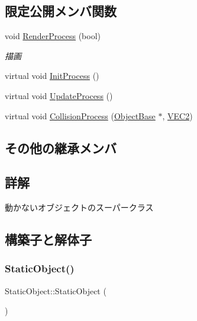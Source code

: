 \subsection*{限定公開メンバ関数}
\begin{DoxyCompactItemize}
\item 
void \mbox{\hyperlink{class_static_object_afec57009537695c4715386120a619942}{Render\+Process}} (bool)
\begin{DoxyCompactList}\small\item\em 描画 \end{DoxyCompactList}\item 
virtual void \mbox{\hyperlink{class_static_object_afa0709f50495338a23c1140062a567af}{Init\+Process}} ()
\item 
virtual void \mbox{\hyperlink{class_static_object_a7fa678c3c4032bb6e9417f93a8bb895c}{Update\+Process}} ()
\item 
virtual void \mbox{\hyperlink{class_static_object_ab17d0cb5b2544054022356a7ee4000db}{Collision\+Process}} (\mbox{\hyperlink{class_object_base}{Object\+Base}} $\ast$, \mbox{\hyperlink{transform_8h_afb0c5e21d4133ff4f200992c0b534e1b}{V\+E\+C2}})
\end{DoxyCompactItemize}
\subsection*{その他の継承メンバ}


\subsection{詳解}
動かないオブジェクトのスーパークラス 

\subsection{構築子と解体子}
\mbox{\label{class_static_object_a2a8e918ddfe5c6723b88b9f5c4156472}} 
\subsubsection{\texorpdfstring{Static\+Object()}{StaticObject()}}
{\footnotesize\ttfamily Static\+Object\+::\+Static\+Object (\begin{DoxyParamCaption}{ }\end{DoxyParamCaption})\hspace{0.3cm}{\ttfamily [inline]}}


